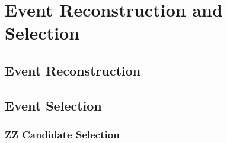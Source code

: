 \section{Event Reconstruction and Selection}
\label{sec:evt_sel}

\subsection{Event Reconstruction}


\subsection{Event Selection}

\subsubsection{ZZ Candidate Selection}
\label{sec:zz_sel}